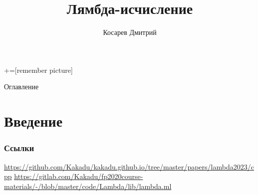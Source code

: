 \documentclass[aspectratio=169
  , xcolor={svgnames}
  , hyperref=
      { colorlinks
      , urlcolor=DarkBlue
      }
  , russian  %
  ]{beamer}
\title[]{Лямбда-исчисление}
\author{Косарев Дмитрий}
\begin{document}
\maketitle

+=[remember picture]

\everymath{\displaystyle}

\begin{frame}{Оглавление}
  \tableofcontents
\end{frame}




\section*{Введение}


\begin{frame}%
  \frametitle<presentation>{Ссылки}
  \begin{thebibliography}{10}
     \url{https://github.com/Kakadu/kakadu.github.io/tree/master/papers/lambda2023/cpp}
     \url{https://gitlab.com/Kakadu/fp2020course-materials/-/blob/master/code/Lambda/lib/lambda.ml}
  \end{thebibliography}
\end{frame}

\appendix


\end{document}
